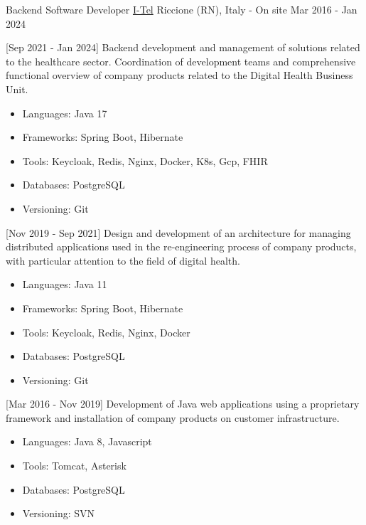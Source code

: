 \begin{cventries}
  \cventry
    {Backend Software Developer} %
    {\href{https://i-tel.it}{I-Tel}} %
    {Riccione (RN), Italy - On site} %
    {Mar 2016 - Jan 2024} %
    {
        [Sep 2021 - Jan 2024] Backend development and management of solutions related to the healthcare sector.
        Coordination of development teams and comprehensive functional overview of company products related to the Digital Health Business Unit.
        \begin{itemize}
      		\item {Languages: Java 17}
      		\item {Frameworks: Spring Boot, Hibernate}
            \item {Tools: Keycloak, Redis, Nginx, Docker, K8s, Gcp, FHIR}
      		\item {Databases: PostgreSQL}
      		\item {Versioning: Git}
      	\end{itemize}
        [Nov 2019 - Sep 2021] Design and development of an architecture for managing distributed applications used in the re-engineering process of company products, with particular attention to the field of digital health.
        \begin{itemize}
      		\item {Languages: Java 11}
      		\item {Frameworks: Spring Boot, Hibernate}
            \item {Tools: Keycloak, Redis, Nginx, Docker}
      		\item {Databases: PostgreSQL}
      		\item {Versioning: Git}
      	\end{itemize}
        [Mar 2016 - Nov 2019] Development of Java web applications using a proprietary framework and installation of company products on customer infrastructure.
      	\begin{itemize}
      		\item {Languages: Java 8, Javascript}
            \item {Tools: Tomcat, Asterisk}
      		\item {Databases: PostgreSQL}
      		\item {Versioning: SVN}
      	\end{itemize}
    }



\end{cventries}
